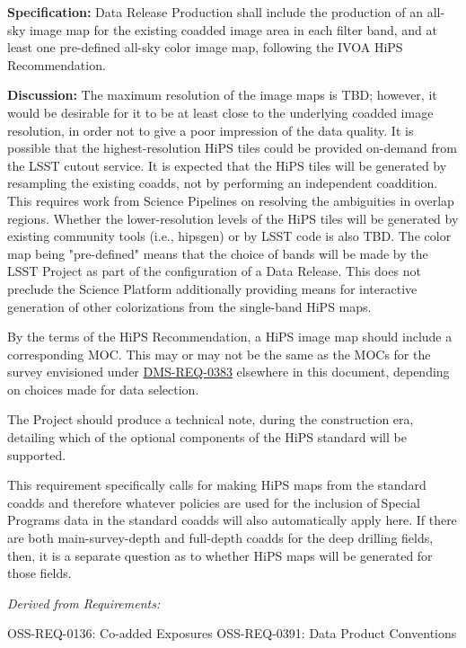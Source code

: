 \documentclass[SE,toc,lsstdraft]{lsstdoc}
\begin{document}
\textbf{Specification:}
Data Release Production shall include the production of an all-sky image map for the existing coadded image area in each filter band, and at least one pre-defined all-sky color image map, following the IVOA HiPS Recommendation.

\textbf{Discussion:}
The maximum resolution of the image maps is TBD; however, it would be desirable for it to be at least close to the underlying coadded image resolution, in order not to give a poor impression of the data quality.  It is possible that the highest-resolution HiPS tiles could be provided on-demand from the LSST cutout service.  It is expected that the HiPS tiles will be generated by resampling the existing coadds, not by performing an independent coaddition.  This requires work from Science Pipelines on resolving the ambiguities in overlap regions.  Whether the lower-resolution levels of the HiPS tiles will be generated by existing community tools (i.e., hipsgen) or by LSST code is also TBD.  The color map being "pre-defined" means that the choice of bands will be made by the LSST Project as part of the configuration of a Data Release.  This does not preclude the Science Platform additionally providing means for interactive generation of other colorizations from the single-band HiPS maps.

By the terms of the HiPS Recommendation, a HiPS image map should include a corresponding MOC.  This may or may not be the same as the MOCs for the survey envisioned under \hyperref[DMS-REQ-0383]{DMS-REQ-0383} elsewhere in this document, depending on choices made for data selection.

The Project should produce a technical note, during the construction era, detailing which of the optional components of the HiPS standard will be supported.

This requirement specifically calls for making HiPS maps from the standard coadds and therefore whatever policies are used for the inclusion of Special Programs data in the standard coadds will also automatically apply here.  If there are both main-survey-depth and full-depth coadds for the deep drilling fields, then, it is a separate question as to whether HiPS maps will be generated for those fields.

\emph{Derived from Requirements:}

OSS-REQ-0136:
Co-added Exposures \newline
OSS-REQ-0391:
Data Product Conventions \newline
\end{document}
